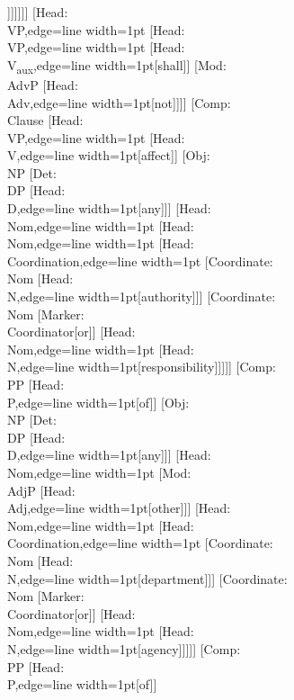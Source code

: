 \documentclass[tikz,border=12pt]{standalone}
\newcommand{\Node}[2]{\small\textsf{#1:}\\{#2}}
\begin{document}
\begin{forest}
                        [\Node{Head}{N},edge={line width=1pt}[section]]]]]]]
    [\Node{Head}{VP},edge={line width=1pt}
        [\Node{Head}{VP},edge={line width=1pt}
            [\Node{Head}{V\textsubscript{aux}},edge={line width=1pt}[shall]]
            [\Node{Mod}{AdvP}
                [\Node{Head}{Adv},edge={line width=1pt}[not]]]]
        [\Node{Comp}{Clause}
            [\Node{Head}{VP},edge={line width=1pt}
                [\Node{Head}{V},edge={line width=1pt}[affect]]
                [\Node{Obj}{NP}
                    [\Node{Det}{DP}
                        [\Node{Head}{D},edge={line width=1pt}[any]]]
                    [\Node{Head}{Nom},edge={line width=1pt}
                        [\Node{Head}{Nom},edge={line width=1pt}
                            [\Node{Head}{Coordination},edge={line width=1pt}
                                [\Node{Coordinate}{Nom}
                                    [\Node{Head}{N},edge={line width=1pt}[authority]]]
                                [\Node{Coordinate}{Nom}
                                    [\Node{Marker}{Coordinator}[or]]
                                    [\Node{Head}{Nom},edge={line width=1pt}
                                        [\Node{Head}{N},edge={line width=1pt}[responsibility]]]]]
                            [\Node{Comp}{PP}
                                [\Node{Head}{P},edge={line width=1pt}[of]]
                                [\Node{Obj}{NP}
                                    [\Node{Det}{DP}
                                        [\Node{Head}{D},edge={line width=1pt}[any]]]
                                    [\Node{Head}{Nom},edge={line width=1pt}
                                        [\Node{Mod}{AdjP}
                                            [\Node{Head}{Adj},edge={line width=1pt}[other]]]
                                        [\Node{Head}{Nom},edge={line width=1pt}
                                            [\Node{Head}{Coordination},edge={line width=1pt}
                                                [\Node{Coordinate}{Nom}
                                                    [\Node{Head}{N},edge={line width=1pt}[department]]]
                                                [\Node{Coordinate}{Nom}
                                                    [\Node{Marker}{Coordinator}[or]]
                                                    [\Node{Head}{Nom},edge={line width=1pt}
                                                        [\Node{Head}{N},edge={line width=1pt}[agency]]]]]
                                            [\Node{Comp}{PP}
                                                [\Node{Head}{P},edge={line width=1pt}[of]]

\end{forest}
\end{document}
